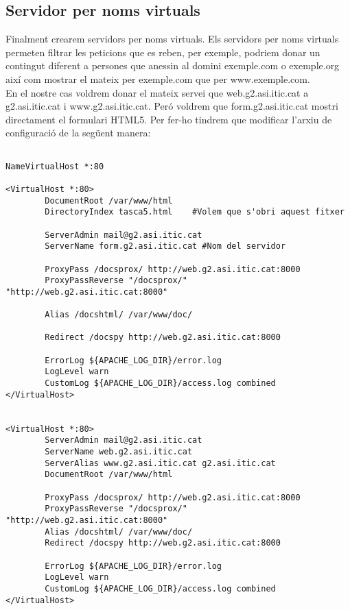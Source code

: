 \documentclass[11p]{article}
\begin{document}
\subsection{Servidor per noms virtuals}
Finalment crearem servidors per noms virtuals. Els servidors per noms virtuals permeten filtrar les peticions que es reben, per exemple, podriem donar un contingut diferent a persones que anessin al domini exemple.com o exemple.org així com mostrar el mateix per exemple.com que per www.exemple.com.\\
En el nostre cas voldrem donar el mateix servei que web.g2.asi.itic.cat a g2.asi.itic.cat i www.g2.asi.itic.cat. Peró voldrem que form.g2.asi.itic.cat mostri directament el formulari HTML5. Per fer-ho tindrem que modificar l'arxiu de configuració de la següent manera:
\begin{lstlisting}

NameVirtualHost *:80

<VirtualHost *:80>
        DocumentRoot /var/www/html
        DirectoryIndex tasca5.html    #Volem que s'obri aquest fitxer

        ServerAdmin mail@g2.asi.itic.cat
        ServerName form.g2.asi.itic.cat	#Nom del servidor

        ProxyPass /docsprox/ http://web.g2.asi.itic.cat:8000
        ProxyPassReverse "/docsprox/" "http://web.g2.asi.itic.cat:8000"

        Alias /docshtml/ /var/www/doc/

        Redirect /docspy http://web.g2.asi.itic.cat:8000

        ErrorLog ${APACHE_LOG_DIR}/error.log
        LogLevel warn
        CustomLog ${APACHE_LOG_DIR}/access.log combined
</VirtualHost>


<VirtualHost *:80>
        ServerAdmin mail@g2.asi.itic.cat
        ServerName web.g2.asi.itic.cat
        ServerAlias www.g2.asi.itic.cat g2.asi.itic.cat
        DocumentRoot /var/www/html

        ProxyPass /docsprox/ http://web.g2.asi.itic.cat:8000
        ProxyPassReverse "/docsprox/" "http://web.g2.asi.itic.cat:8000"
        Alias /docshtml/ /var/www/doc/
        Redirect /docspy http://web.g2.asi.itic.cat:8000

        ErrorLog ${APACHE_LOG_DIR}/error.log
        LogLevel warn
        CustomLog ${APACHE_LOG_DIR}/access.log combined
</VirtualHost>

\end{lstlisting}
\end{document}
